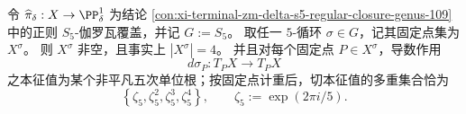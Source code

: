 
\begin{theorem}\label{thm:xi-terminal-zm-delta-s5-5cycle-tangent-spectrum}
令 \(\widehat\pi_\delta:X\to\PP^1_\delta\) 为结论 \ref{con:xi-terminal-zm-delta-s5-regular-closure-genus-109} 中的正则 \(S_5\)-伽罗瓦覆盖，并记 \(G:=S_5\)。
取任一 \(5\)-循环 \(\sigma\in G\)，记其固定点集为 \(X^\sigma\)。
则 \(X^\sigma\) 非空，且事实上 \(|X^\sigma|=4\)。
并且对每个固定点 \(P\in X^\sigma\)，导数作用
\[
d\sigma_P:T_PX\to T_PX
\]
之本征值为某个非平凡五次单位根；按固定点计重后，切本征值的多重集合恰为
\[
\left\{\zeta_5,\zeta_5^{2},\zeta_5^{3},\zeta_5^{4}\right\},
\qquad \zeta_5:=\exp(2\pi i/5).
\]
\end{theorem}
